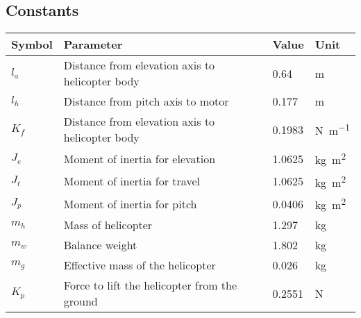 \subsection{Constants}
\begin{center}
\begin{tabular}{l l l l}
\hline
Symbol & Parameter & Value & Unit \\ \hline
$l_a$ & Distance from elevation axis to helicopter body & 0.64 & m \\
$l_h$ & Distance from pitch axis to motor & 0.177 & m \\
$K_f$ & Distance from elevation axis to helicopter body & 0.1983 &\si{\newton \per \meter}  \\
$J_e$ & Moment of inertia for elevation & 1.0625 & \si{\kilogram \meter \squared}  \\
$J_t$ & Moment of inertia for travel & 1.0625 & \si{\kilogram \meter \squared}  \\
$J_p$ & Moment of inertia for pitch & 0.0406 & \si{\kilogram \meter \squared}  \\
$m_h$ & Mass of helicopter & 1.297 &\si{\kilogram}  \\
$m_w$ & Balance weight & 1.802 & \si{\kilogram} \\
$m_g$ & Effective mass of the helicopter & 0.026 & \si{\kilogram} \\
$K_p$ & Force to lift the helicopter from the ground & 0.2551 & \si{\newton}
\end{tabular}
\end{center}
\label{table:constants}



